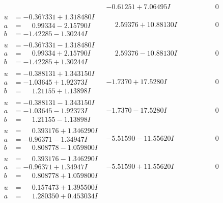 \documentclass[1p]{elsarticle_modified}
\theoremstyle{definition}
\begin{document}
$$\begin{array}{c|c|c}
 & -0.61251 + 7.06495 I & \phantom{-0.000000 } 0 \\ \hline\begin{aligned}
u &= -0.367331 + 1.318480 I \\
a &= \phantom{-}0.99334 - 2.15790 I \\
b &= -1.42285 - 1.30244 I\end{aligned}
 & \phantom{-}2.59376 + 10.88130 I & \phantom{-0.000000 } 0 \\ \hline\begin{aligned}
u &= -0.367331 - 1.318480 I \\
a &= \phantom{-}0.99334 + 2.15790 I \\
b &= -1.42285 + 1.30244 I\end{aligned}
 & \phantom{-}2.59376 - 10.88130 I & \phantom{-0.000000 } 0 \\ \hline\begin{aligned}
u &= -0.388131 + 1.343150 I \\
a &= -1.03645 + 1.92373 I \\
b &= \phantom{-}1.21155 + 1.13898 I\end{aligned}
 & -1.7370 + 17.5280 I & \phantom{-0.000000 } 0 \\ \hline\begin{aligned}
u &= -0.388131 - 1.343150 I \\
a &= -1.03645 - 1.92373 I \\
b &= \phantom{-}1.21155 - 1.13898 I\end{aligned}
 & -1.7370 - 17.5280 I & \phantom{-0.000000 } 0 \\ \hline\begin{aligned}
u &= \phantom{-}0.393176 + 1.346290 I \\
a &= -0.96371 - 1.34947 I \\
b &= \phantom{-}0.808778 - 1.059800 I\end{aligned}
 & -5.51590 - 11.55620 I & \phantom{-0.000000 } 0 \\ \hline\begin{aligned}
u &= \phantom{-}0.393176 - 1.346290 I \\
a &= -0.96371 + 1.34947 I \\
b &= \phantom{-}0.808778 + 1.059800 I\end{aligned}
 & -5.51590 + 11.55620 I & \phantom{-0.000000 } 0 \\ \hline\begin{aligned}
u &= \phantom{-}0.157473 + 1.395500 I \\
a &= \phantom{-}1.280350 + 0.453034 I \\

\end{aligned}
\end{array}$$
\end{document}
